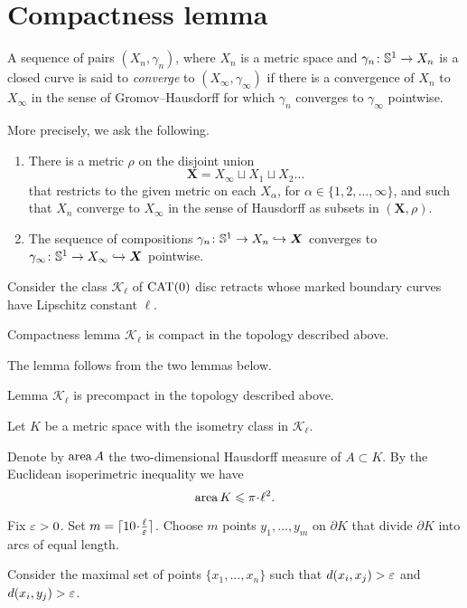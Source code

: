 \section{Compactness lemma}\label{Compactness}

A sequence of pairs $(X_n,\gamma_n)$, where $X_n$ is a metric space and $\gamma_n\colon\mathbb{S}^1\to X_n$ is a 
closed curve is said to \emph{converge} to $(X_\infty,\gamma_\infty)$ if there is a convergence of $X_n$ to $X_\infty$ 
in the sense of Gromov--Hausdorff for which $\gamma_n$ converges to $\gamma_\infty$ pointwise.

More precisely, we ask the following.
\begin{enumerate}[(1)]
	\item There is a metric $\rho$ on the disjoint union 
\[\bm{X}=X_\infty\sqcup X_1\sqcup X_2\dots\]
that restricts to the given metric on each $X_\alpha$, for $\alpha\in\{1,2,\dots,\infty\}$, 
and such that $X_n$ converge to $X_\infty$ in the sense of Hausdorff as subsets in $(\bm{X},\rho)$.
\item  The sequence of compositions $\gamma_n\colon\mathbb{S}^1\to X_n \hookrightarrow\bm{X}$ 
converges to $\gamma_\infty\:\SS^1\zz\to X_\infty \hookrightarrow\bm{X}$ pointwise.
\end{enumerate}
Consider the class $\mathcal{K}_\ell$ of $\mathop{\rm CAT}\nolimits(0)$ disc retracts whose marked
boundary curves have Lipschitz constant $\ell$.


\begin{thm}{Compactness lemma}\label{lem:compact}
$\mathcal{K}_\ell$ is compact in the topology described above.
\end{thm}

The lemma follows from the two lemmas below.

\begin{thm}{Lemma}\label{lem:precompact}
$\mathcal{K}_\ell$ is precompact in the topology described above.
\end{thm}

Let $K$ be a metric space with the isometry class in $\mathcal {K}_\ell$.

Denote by $\mathop{\rm area}\nolimits A$ the two-dimensional Hausdorff measure of $A\subset K$.
By the Euclidean isoperimetric inequality we have 
\[\area K \le \pi\cdot\ell^2.\]

Fix $\varepsilon>0$. 
Set $m=\lceil 10\cdot\tfrac\ell\eps\rceil$.
Choose $m$ points $y_1,\dots,y_m$ on $\partial K$ that divide $\partial K$ into arcs of equal length.

Consider the maximal set of points $\{x_1,\dots,x_n\}$ such that $d(x_i,x_j)>\varepsilon$ and $d(x_i,y_j)>\varepsilon$.

